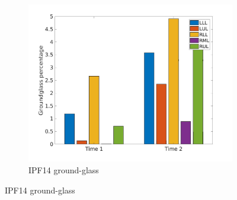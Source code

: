 \begin{figure}[H] 
\centering
\begin{subfigure}{.46\linewidth}%
  \includegraphics[width=\linewidth,trim={{.0\wd0} {.0\wd0} {.0\wd0} {.0\wd0}},clip]{Appendix/Image_AppexA/LobarDistribution/IPF14GroundglassLobarRegionDiseaseDistributionOverTime.jpg} %
  \caption{IPF14 ground-glass}
  \label{fig:IPF14LobarRegionDiseaseDistributionOverTime-a} 
\end{subfigure} 
\hspace{.3in}

\end{figure}
